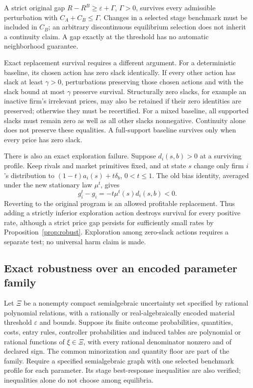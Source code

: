 \documentclass[11pt,a4paper]{article}
\begin{document}
A strict original gap $R-R^B\geq\varepsilon+\Gamma$, $\Gamma>0$, survives
every admissible perturbation with $C_A+C_B\leq\Gamma$. Changes in a selected
stage benchmark must be included in $C_B$; an arbitrary discontinuous equilibrium
selection does not inherit a continuity claim. A gap exactly at the threshold
has no automatic neighborhood guarantee.

Exact replacement survival requires a different argument. For a deterministic
baseline, its chosen action has zero slack identically. If every other action
has slack at least $\gamma>0$, perturbations preserving those chosen actions
and with the slack bound at most $\gamma$ preserve survival. Structurally zero
slacks, for example an inactive firm's irrelevant prices, may also be retained
if their zero identities are preserved; otherwise they must be recertified.
For a mixed baseline, all supported slacks must remain zero as well as all
other slacks nonnegative. Continuity alone does not preserve these equalities.
A full-support baseline survives only when every price has zero slack.

There is also an exact exploration failure. Suppose $d_i(s,b)>0$ at a surviving
profile. Keep rivals and market primitives fixed, and at state $s$ change only
firm $i$'s distribution to $(1-t)a_i(s)+t\delta_b$, $0<t\leq1$.
The old bias identity, averaged under the new stationary law $\mu^t$, gives
\[
 g_i^t-g_i=-t\mu^t(s)d_i(s,b)<0.
\]
Reverting to the original program is an allowed profitable replacement.
Thus adding a strictly inferior exploration action destroys survival for every
positive rate, although a strict price gap persists for sufficiently small
rates by Proposition~\ref{prop:robust}. Exploration among zero-slack actions
requires a separate test; no universal harm claim is made.

\subsection*{Exact robustness over an encoded parameter family}
Let $\Xi$ be a nonempty compact semialgebraic uncertainty set specified by
rational polynomial relations, with a rationally or real-algebraically encoded
material threshold $\varepsilon$ and bounds. Suppose its finite outcome probabilities,
quantities, costs, entry rules, controller probabilities and induced tables
are polynomial or rational functions of $\xi\in\Xi$, with every rational
denominator nonzero and of declared sign. The common minorization and quantity
floor are part of the family. Require a specified semialgebraic graph with
one selected benchmark profile for each parameter. Its stage best-response
inequalities are also verified; inequalities alone do not choose among equilibria.
\end{document}
